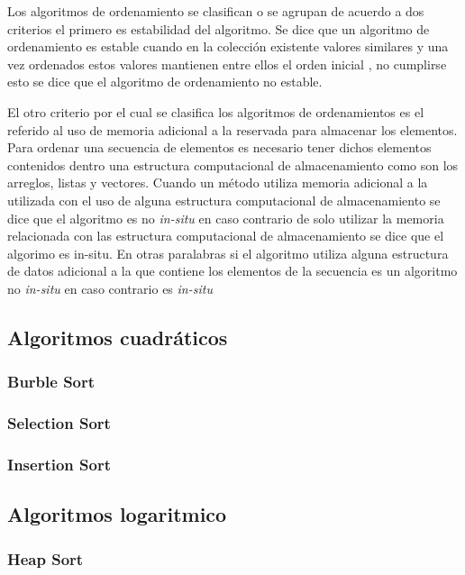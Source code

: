 Los algoritmos de ordenamiento se clasifican o se agrupan de acuerdo a dos criterios el primero es estabilidad del algoritmo. Se dice que un algoritmo de ordenamiento es estable cuando en la colección existente valores similares y una vez ordenados estos valores mantienen entre ellos el orden inicial , no cumplirse esto se dice que el algoritmo de ordenamiento no estable.

El otro criterio por el cual se clasifica los algoritmos de ordenamientos es el referido al uso de memoria adicional a la reservada para almacenar los elementos. Para ordenar una secuencia de elementos es necesario tener dichos elementos contenidos dentro una estructura  computacional de almacenamiento como son los arreglos, listas y vectores. Cuando un método utiliza memoria adicional a la  utilizada con el uso de alguna estructura computacional de almacenamiento se dice que el algoritmo es no {\em in-situ} en caso contrario de solo utilizar la memoria relacionada con las estructura computacional de almacenamiento  se dice que el algorimo es in-situ. En otras paralabras si el algoritmo utiliza alguna estructura de datos adicional a la que contiene los elementos de la secuencia es un algoritmo no {\em in-situ} en caso contrario es {\em in-situ}

\subsection{Algoritmos cuadráticos}

\subsubsection{Burble Sort}


\subsubsection{Selection Sort}


\subsubsection{Insertion Sort}

\subsection{Algoritmos logaritmico}

\subsubsection{Heap Sort}



